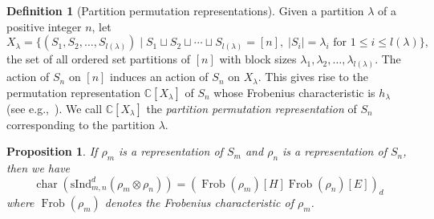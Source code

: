 \documentclass[12pt,reqno]{amsart}
\newtheorem{proposition}[theorem]{Proposition}
\theoremstyle{definition}
\newtheorem{definition}[theorem]{Definition}
\theoremstyle{remark}
\newcommand{\ind}{\mathrm{sInd}_{m,n}^{d}}
\DeclareMathOperator{\fr}{{Frob}}
\DeclareMathOperator{\ch}{char}
\begin{document}
\begin{definition}[Partition permutation representations]
Given a partition $\lambda$ of a positive integer $n$, let
\begin{displaymath}
    X_\lambda = \{(S_1, S_2, \dotsc, S_{l(\lambda)})\mid S_1\sqcup S_2\sqcup \dotsb \sqcup S_{l(\lambda)} = [n], \; |S_i|=\lambda_i \text{ for } 1\leq i\leq l(\lambda)\},
\end{displaymath}
the set of all ordered set partitions of $[n]$ with block sizes $\lambda_1,\lambda_2,\dotsc,\lambda_{l(\lambda)}$.
The action of $S_n$ on $[n]$ induces an action of $S_n$ on $X_\lambda$. This gives rise to the permutation representation $\mathbb C[X_\lambda]$ of $S_n$ whose Frobenius characteristic is $h_\lambda$ (see e.g.,~\cite[Exercise 5.5.5]{prasad2015representation}). We call $\mathbb{C}[X_{\lambda}]$ the \textit{partition permutation representation} of $S_n$ corresponding to the partition $\lambda$.
\end{definition}
\begin{proposition}\label{permutationmodules}
    If $\rho_{m}$ is a representation of $S_m$ and $\rho_n$ is a representation of $S_n$, then we have
    $$\ch(\ind(\rho_{m}\otimes \rho_{n}))=(\fr(\rho_{m})[H]\fr(\rho_{n})[E])_{d}$$
    where $\fr(\rho_m)$ denotes the Frobenius characteristic of $\rho_m$.
\end{proposition}
\end{document}
